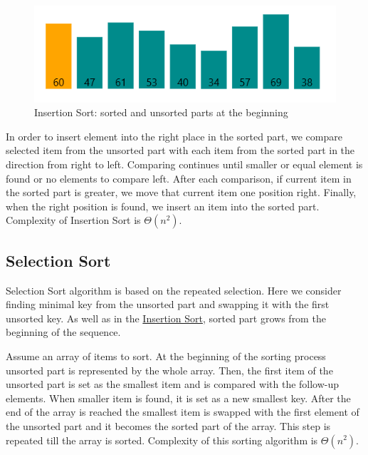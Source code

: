 \documentclass[
  field=inf,
  biblatex,
  language=english,
  glossaries,
  theorems=false,
  sourcecodes=false,
  index
]{kidiplom}
\begin{document}
\begin{figure}[H]
\begin{center}
	
	\includegraphics[scale=0.7]{img/Insertion.png}
	\caption{Insertion Sort: sorted and unsorted parts at the beginning}\label{fig:insert}
\end{center}
\end{figure}

In order to insert element into the right place in the sorted part, we compare selected item from the unsorted part with each item from the sorted part in the direction from right to left. Comparing continues until smaller or equal element is found or no elements to compare left. After each comparison, if current item in the sorted part is greater, we move that current item one position right. Finally, when the right position is found, we insert an item into the sorted part. Complexity of Insertion Sort is $\Theta(n^2)$.

\subsection{Selection Sort}
\label{sec:selection}

Selection Sort algorithm is based on the repeated selection. Here we consider finding minimal key from the unsorted part and swapping it with the first unsorted key. As well as in the \hyperref[sec:insertion]{Insertion Sort}, sorted part grows from the beginning of the sequence.

Assume an array of items to sort. At the beginning of the sorting process unsorted part is represented by the whole array. Then, the first item of the unsorted part is set as the smallest item and is compared with the follow-up elements. When smaller item is found, it is set as a new smallest key. After the end of the array is reached the smallest item is swapped with the first element of the unsorted part and it becomes the sorted part of the array. This step is repeated till the array is sorted. Complexity of this sorting algorithm is $\Theta(n^2)$.
\end{document}
